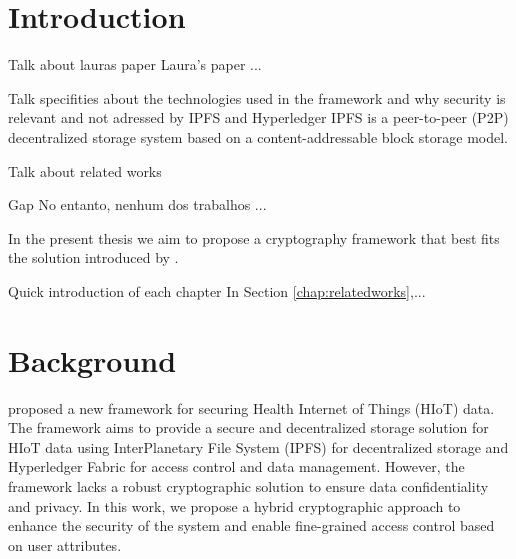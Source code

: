 \documentclass[cic,tc,english]{iiufrgs}
\begin{document}
\tableofcontents

\chapter{Introduction}
    \label{chap:introduction}
    \begin{draft}{Talk about lauras paper}
        Laura's paper ...
    \end{draft}


    \begin{draft}{Talk specifities about the technologies used in the framework and why security is relevant and not adressed by IPFS and Hyperledger}
        IPFS \cite{benet2013ipfs} is a peer-to-peer (P2P) decentralized storage system based on a content-addressable block storage model.
    \end{draft}

    \begin{draft}{Talk about related works}
        
    \end{draft}

    \begin{draft}{Gap}
        No entanto, nenhum dos trabalhos ...
    \end{draft}


    In the present thesis we aim to propose a cryptography framework that best fits the solution introduced by \citet{laura2023}.


    \begin{draft}{Quick introduction of each chapter}
        In Section \ref{chap:relatedworks},...

    \end{draft}

\chapter{Background}
    \label{chap:background}

    \citet{laura2023} proposed a new framework for securing Health Internet of Things (HIoT) data. The framework aims to provide a secure and decentralized storage solution for HIoT data using InterPlanetary File System (IPFS) \cite{benet2013ipfs} for decentralized storage and Hyperledger Fabric \cite{fabric} for access control and data management. However, the framework lacks a robust cryptographic solution to ensure data confidentiality and privacy. In this work, we propose a hybrid cryptographic approach to enhance the security of the system and enable fine-grained access control based on user attributes.
\end{document}
